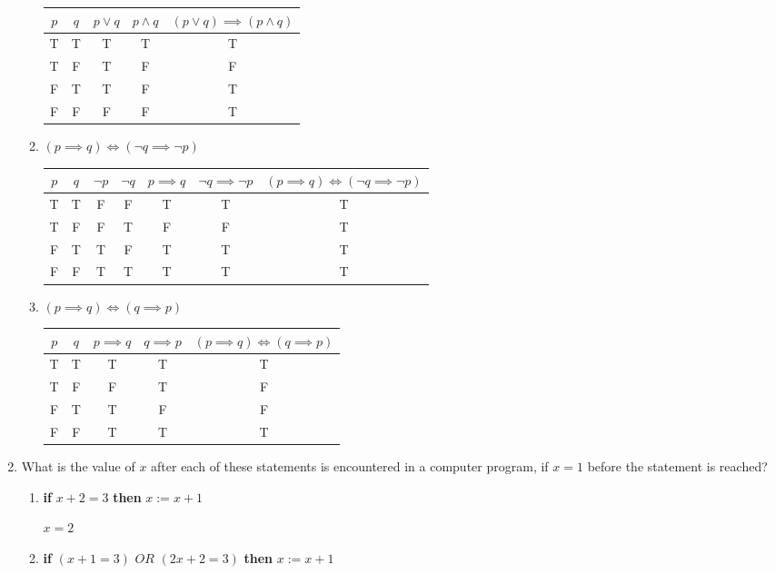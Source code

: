 \documentclass[11pt]{article}
\begin{document}
\begin{enumerate}[label=\textbf{\arabic*.}]
\begin{enumerate}[label=\textbf{\alph*)}]
		\begin{tabular}{c | c | c | c | c}
			$p$ & $q$ & $p \lor q$ & $p \land q$ & $(p \lor q) \implies (p \land q)$ \\
			\hline
			T & T & T & T & T \\
			T & F & T & F & F \\
			F & T & T & F & T \\
			F & F & F & F & T \\
		\end{tabular}
		
		\item $(p \implies q) \iff (\neg q \implies \neg p)$
		
		\begin{tabular}{c | c | c | c | c | c | c}
			$p$ & $q$ & $\neg p$ & $\neg q$ & $p \implies q$ & $\neg q \implies \neg p$ & $(p \implies q) \iff (\neg q \implies \neg p)$ \\
			\hline
			T & T & F & F & T & T &T \\
			T & F & F & T & F & F & T \\
			F & T & T & F & T & T & T \\
			F & F & T & T & T & T & T \\
		\end{tabular}
		
		\item $(p \implies q) \iff (q \implies p)$
		
		\begin{tabular}{c | c | c | c | c}
			$p$ & $q$ & $p \implies q$ & $q \implies p$ & $(p \implies q) \iff (q \implies p)$ \\
			\hline
			T & T & T & T & T \\
			T & F & F & T & F \\
			F & T & T & F & F \\
			F & F & T & T & T \\
		\end{tabular}
	\end{enumerate}

	\item What is the value of $x$ after each of these statements is encountered in a computer program, if $x = 1$ before the statement is reached?
	\begin{enumerate}[label=\textbf{\alph*)}]
		\item \textbf{if} $x + 2 = 3$ \textbf{then} $x := x + 1$
		
		$x = 2$
		
		\item \textbf{if} $(x + 1 = 3)$ $OR$ $(2x + 2 = 3)$ \textbf{then} $x := x + 1$
		

\end{enumerate}
\end{enumerate}
\end{document}

